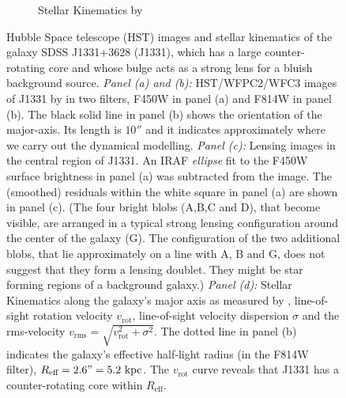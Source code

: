 \begin{figure}
\begin{subfigure}{.5\textwidth}
  \caption{Stellar Kinematics by \citet{SWELLSV}}
  \label{fig:kinematics}
\end{subfigure}
\caption{Hubble Space telescope (HST) images and stellar kinematics of the galaxy SDSS J1331+3628 (J1331), which has a large counter-rotating core and whose bulge acts as a strong lens for a bluish background source. \emph{Panel (a) and (b):} HST/WFPC2/WFC3 images of J1331 by \citet{SWELLSI} in two filters, F450W in panel (a) and F814W in panel (b). The black solid line in panel (b) shows the orientation of the major-axis. Its length is $10''$ and it indicates approximately where we carry out the dynamical modelling. \emph{Panel (c):} Lensing images in the central region of J1331.  An IRAF \emph{ellipse} fit to the F450W surface brightness in panel (a) was subtracted from the image. The (smoothed) residuals within the white square in panel (a) are shown in panel (c). (The four bright blobs (A,B,C and D), that become visible, are arranged in a typical strong lensing configuration around the center of the galaxy (G). The configuration of the two additional blobs, that lie approximately on a line with A, B and G, does not suggest that they form a lensing doublet. They might be star forming regions of a background galaxy.) \emph{Panel (d):} Stellar Kinematics along the galaxy's major axis as measured by \citet{SWELLSV}, line-of-sight rotation velocity $v_\text{rot}$, line-of-sight velocity dispersion $\sigma$ and the rms-velocity $v_\text{rms} = \sqrt{v_\text{rot}^2 + \sigma^2}$. The dotted line in panel (b) indicates the galaxy's effective half-light radius (in the F814W filter), $R_\text{eff} = 2.6" = 5.2~\text{kpc}$. The $v_\text{rot}$ curve reveals that J1331 has a counter-rotating core within $R_\text{eff}$.}
\label{fig:specialJ1331}
\end{figure}